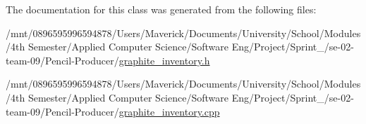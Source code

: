 The documentation for this class was generated from the following files\+:\begin{DoxyCompactItemize}
\item 
/mnt/0896595996594878/\+Users/\+Maverick/\+Documents/\+University/\+School/\+Modules/4th Semester/\+Applied Computer Science/\+Software Eng/\+Project/\+Sprint\+\_/se-\/02-\/team-\/09/\+Pencil-\/\+Producer/\hyperlink{graphite__inventory_8h}{graphite\+\_\+inventory.\+h}\item 
/mnt/0896595996594878/\+Users/\+Maverick/\+Documents/\+University/\+School/\+Modules/4th Semester/\+Applied Computer Science/\+Software Eng/\+Project/\+Sprint\+\_/se-\/02-\/team-\/09/\+Pencil-\/\+Producer/\hyperlink{graphite__inventory_8cpp}{graphite\+\_\+inventory.\+cpp}\end{DoxyCompactItemize}
